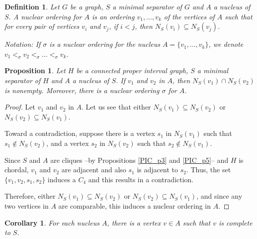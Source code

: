 \documentclass[12pt]{book}
\theoremstyle{plain}
\newtheorem{prop}[teo]{Proposition}
\newtheorem{cor}[teo]{Corollary}
\newtheorem{defn}[teo]{Definition}
\theoremstyle{remark}
\begin{document}


\begin{defn} \label{PIC_def2}
	Let $G$ be a graph, $S$ a minimal separator of $G$ and $A$ a nucleus of $S$. 
	\emph{A nuclear ordering for $A$} is an ordering $v_1, \ldots, v_k$ of the vertices of $A$ such that for every pair of vertices $v_i$ and $v_j$,
	if $i<j$, then $N_{S}(v_i) \subseteq N_{S}(v_j)$.
	
	\textit{Notation:} If $\sigma$ is a nuclear ordering for the nucleus $A = \{ v_1, \ldots, v_k \}$, 
	we denote $v_1 <_{\sigma} v_2 <_{\sigma} \ldots <_{\sigma} v_k$.
\end{defn}

\begin{prop} \label{PIC_p6} %
	Let $H$ be a connected proper interval graph, $S$ a minimal separator of $H$ and $A$ a nucleus of $S$. 
	If $v_1$ and $v_2$ in $A$, then $N_{S}(v_1) \cap N_{S}(v_2)$ is nonempty. Moreover, there is a nuclear ordering $\sigma$ for $A$.
\end{prop}

\begin{proof}
	Let $v_1$ and $v_2$ in $A$.  Let us see that either $N_{S}(v_1) \subseteq N_{S}(v_2)$ or $N_{S}(v_2) \subseteq N_{S}(v_1)$.
	
	Toward a contradiction, suppose there is a vertex $s_1$ in $N_{S}(v_1)$ such that $s_1 \notin N_{S}(v_2)$, and a vertex
	$s_2$ in $N_{S}(v_2)$ such that $s_2 \notin N_{S}(v_1)$. 
			
	Since $S$ and $A$ are cliques --by Propositions \ref{PIC_p3} and \ref{PIC_p5}-- and $H$ is chordal,
	$v_1$ and $v_2$ are adjacent and also $s_1$ is adjacent to $s_2$. Thus, the set $\{ v_1,v_2,s_1,s_2 \}$ induces a $C_4$ and this results in a contradiction.	
	
	Therefore, either $N_{S}(v_1) \subseteq N_{S}(v_2)$ or $N_{S}(v_2) \subseteq N_{S}(v_1)$, and since any two vertices in $A$ are comparable, this induces a nuclear ordering in $A$.
\end{proof}

\begin{cor}
	For each nucleus $A$, there is a vertex $v \in A$ such that $v$ is complete to $S$.
\end{cor}
\end{document}
